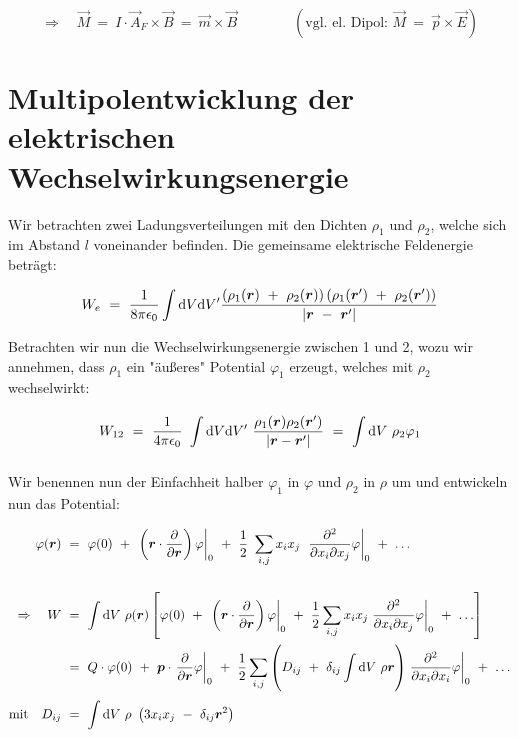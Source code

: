 \begin{equation*}
\Rightarrow \quad \vec{M}  \ = \ I\cdot \vec{A}_F \times \vec{B} \ = \ \vec{m}\times\vec{B} \qquad\qquad (\text{vgl. el. Dipol: } \vec{M}  \ = \ \vec{p}\times\vec{E})
\end{equation*}

\section{Multipolentwicklung der elektrischen Wechselwirkungsenergie}

Wir betrachten zwei Ladungsverteilungen mit den Dichten $\rho_1$ und $\rho_2$, welche sich im Abstand $l$ voneinander befinden. Die gemeinsame elektrische Feldenergie beträgt:

\begin{equation*}
W_e \ = \ \frac{1}{8\pi\epsilon_0}\int\d V \d V' \frac{\left(\rho_1(\vec{r}) \ + \ \rho
	_2(\vec{r})\right)\left(\rho_1 (\vec{r}') \ + \ \rho_2(\vec{r}')\right)}{|\vec{r} \ - \ \vec{r}'|}
\end{equation*}

Betrachten wir nun die Wechselwirkungsenergie zwischen 1 und 2, wozu wir annehmen, dass $\rho_1$ ein "äußeres" Potential $\varphi_1$ erzeugt, welches mit $\rho_2$ wechselwirkt:

\begin{equation*}
W_{12} \ = \  \frac{1}{4\pi\epsilon_0} \ \int\d V \d V' \ \frac{\rho_1(\vec{r})\rho_2(\vec{r}')}{|\vec{r}-\vec{r}'|} \ = \ \Int{}{}{V} \rho_2\varphi_1
\end{equation*}

Wir benennen nun der Einfachheit halber $\varphi_1$ in $\varphi$ und $\rho_2$ in $\rho$ um und entwickeln nun das Potential:

\begin{align*}
\varphi(\vec{r})  \ &= \  \varphi(0) \ + \ \left.\left(\vec{r}\cdot\pdiff{}{\vec{r}}\right)\varphi\right|_0 \ + \ \frac{1}{2}\ \sum_{i,j} x_i x_j \ \left.\frac{\partial ^2}{\partial x_i  \partial x_j}\varphi\right|_0 \ + \ \ldots \\
\ \\
\Rightarrow \quad W \ &= \ \Int{}{}{V}\rho(\vec{r})\left[\varphi(0) \ + \ \left.\left(\vec{r}\cdot\pdiff{}{\vec{r}}\right)\varphi\right|_0 \ + \ \frac{1}{2} \sum_{i,j}x_i x_j \left.\frac{\partial^2}{\partial x_i \partial x_j}\varphi\right|_0 \ + \ \ldots\right]\\
&= \ Q\cdot\varphi(0) \ + \ \vec{p}\cdot\left.\pdiff{}{\vec{r}}\varphi\right|_0 \ + \ \frac{1}{2}\sum_{i,j}\left(D_{ij} \ + \ \delta_{ij}\Int{}{}{V}\rho\vec{r}\right)\left.\frac{\partial^2}{\partial x_i \partial x_i}\varphi\right|_0 \ + \ \ldots\\
\text{mit} \quad D_{ij} \ &= \ \Int{}{}{V} \rho \ \left(3x_i x_j\ - \ \delta_{ij}\vec{r}^2\right)
\end{align*}

